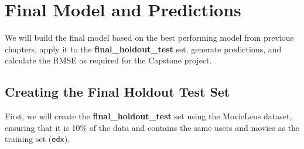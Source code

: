 \documentclass[
]{article}
\begin{document}
\section{Final Model and Predictions}\label{final-model-and-predictions}

We will build the final model based on the best performing model from
previous chapters, apply it to the \textbf{final\_holdout\_test} set,
generate predictions, and calculate the RMSE as required for the
Capstone project.

\subsection{Creating the Final Holdout Test
Set}\label{creating-the-final-holdout-test-set}

First, we will create the \textbf{final\_holdout\_test} set using the
MovieLens dataset, ensuring that it is 10\% of the data and contains the
same users and movies as the training set (\texttt{edx}).
\end{document}
